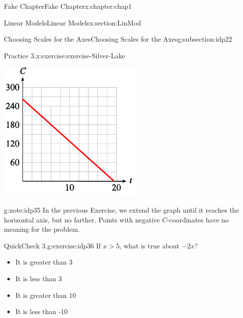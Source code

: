 \documentclass[oneside,10pt,]{book}
\numberwithin{equation}{section}
\newcommand{\gt}{>}
\begin{document}
\begin{chapterptx}{Fake Chapter}{}{Fake Chapter}{}{}{x:chapter:chap1}
\begin{sectionptx}{Linear Models}{}{Linear Models}{}{}{x:section:LinMod}
\begin{subsectionptx}{Choosing Scales for the Axes}{}{Choosing Scales for the Axes}{}{}{g:subsection:idp22}
\begin{inlineexercise}{Practice 3.}{x:exercise:exercise-Silver-Lake}
\begin{sidebyside}{1}{0.35}{0.35}{0}
\begin{sbspanel}{0.3}
\includegraphics[width=\linewidth]{external/photos/fig-in-ex-ans-1-1-3.pdf}
\end{sbspanel}%
\end{sidebyside}%
\par
\end{inlineexercise}%
\begin{note}{}{g:note:idp35}%
In the previous Exercise, we extend the graph until it reaches the horizontal axis, but no farther.  Points with negative \(C\)-coordinates have no meaning for the problem.%
\end{note}
\begin{inlineexercise}{QuickCheck 3.}{g:exercise:idp36}%
If \(x \gt 5\text{,}\) what is true about \(-2x\text{?}\)%
\par
\begin{itemize}[label=$\odot$,leftmargin=3em,]
\item{}It is greater than 3%

\item{}It is less than 3%

\item{}It is greater than 10%

\item{}It is less than -10%


\end{itemize}
\end{inlineexercise}
\end{subsectionptx}
\end{sectionptx}
\end{chapterptx}
\end{document}
